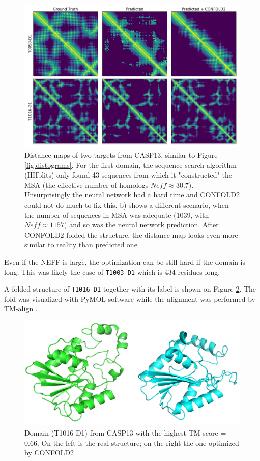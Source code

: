 \begin{figure}
    \centering
    \includegraphics[width=\linewidth]{imgs_tomas/casp_distance_maps_test_structures.png}
    \caption{Distance maps of two targets from CASP13, similar to Figure \ref{fig:distograms}. For the first domain, the sequence search algorithm (HHblits) only found 43 sequences from which it "constructed" the MSA (the effective number of homologs $Neff \approx 30.7$).  Unsurprisingly the neural network had a hard time and CONFOLD2 could not do much to fix this. b) shows a different scenario, when the number of sequences in MSA was adequate (1039, with $Neff \approx 1157$) and so was the neural network prediction. After CONFOLD2 folded the structure, the distance map looks even more similar to reality than predicted one}
    \label{fig:casp_distmaps}
\end{figure}

Even if the NEFF is large, the optimization can be still hard if the domain is long. This was likely the case of \texttt{T1003-D1} which is 434 residues long. 

A folded structure of \texttt{T1016-D1} together with its label is shown on Figure \ref{fig:T1016}. The fold was visualized with PyMOL \cite{pymol} software while the alignment was performed by TM-align \cite{tmalign}.

\begin{figure}
    \centering
    \includegraphics[width=\linewidth]{imgs_tomas/T1016_structure.png}
    \caption{Domain (T1016-D1) from CASP13 with the highest TM-score = 0.66. On the left is the real structure; on the right the one optimized by CONFOLD2}
    \label{fig:T1016}
\end{figure}

